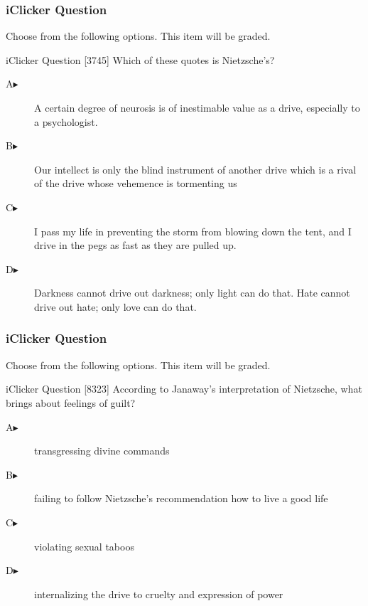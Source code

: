 \documentclass[xcolor=dvipsnames]{beamer}
\begin{document}
\begin{frame}
  \frametitle{iClicker Question}
Choose from the following options. This item will be graded.
\begin{block}{iClicker Question}
[3745] Which of these quotes is Nietzsche's?
\end{block}
\begin{description}
\item[A\hspace{.2in}$\blacktriangleright$] A certain degree of neurosis is of inestimable value as a drive, especially to a psychologist.
\item[B\hspace{.2in}$\blacktriangleright$] Our intellect is only the blind instrument of another drive which is a rival of the drive whose vehemence is tormenting us
\item[C\hspace{.2in}$\blacktriangleright$] I pass my life in preventing the storm from blowing down the tent, and I drive in the pegs as fast as they are pulled up.
\item[D\hspace{.2in}$\blacktriangleright$] Darkness cannot drive out darkness; only light can do that. Hate cannot drive out hate; only love can do that.
\end{description}
\end{frame}

\begin{frame}
  \frametitle{iClicker Question}
Choose from the following options. This item will be graded.
\begin{block}{iClicker Question}
[8323] According to Janaway's interpretation of Nietzsche, what brings about feelings of guilt?
\end{block}
\begin{description}
\item[A\hspace{.2in}$\blacktriangleright$] transgressing divine commands
\item[B\hspace{.2in}$\blacktriangleright$] failing to follow Nietzsche's recommendation how to live a good life
\item[C\hspace{.2in}$\blacktriangleright$] violating sexual taboos
\item[D\hspace{.2in}$\blacktriangleright$] internalizing the drive to cruelty and expression of power
\end{description}
\end{frame}
\end{document}
